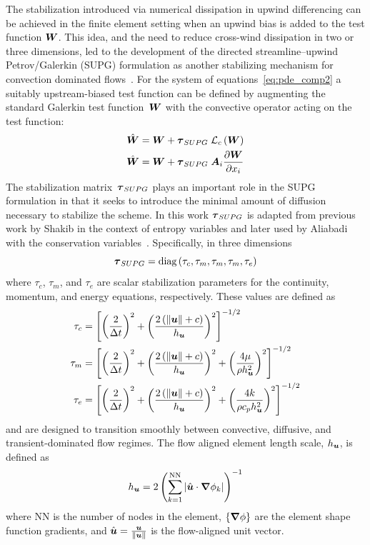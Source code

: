 The stabilization introduced via numerical dissipation in upwind differencing can be achieved in the finite element setting when an upwind bias is added to the test function ${\boldsymbol{W}}$.  This idea, and the need to reduce cross-wind dissipation in two or three dimensions, led to the development of the directed  streamline--upwind Petrov/Galerkin (SUPG) formulation as another stabilizing mechanism for convection dominated flows~\cite{ hughes_mallet_SUPG}.    For the system of equations~\eqref{eq:pde_comp2} a suitably upstream-biased test function can be defined by augmenting the standard Galerkin test function~${\boldsymbol{W}}$ with the convective operator acting on the test function:
\begin{align}
  \hat{{\boldsymbol{W}}} &= {\boldsymbol{W}} + {\boldsymbol{\tau}}_{SUPG}\;{\cal L}_c\left({\boldsymbol{W}}\right) \nonumber \\
  \label{eq:test_function_SUPG}
  \hat{{\boldsymbol{W}}} &= {\boldsymbol{W}} + {\boldsymbol{\tau}}_{SUPG}\;{\boldsymbol{A}}_i{\frac{\partial{{\boldsymbol{W}}}}{\partial{x_i}}}
\end{align}
The stabilization matrix~${\boldsymbol{\tau}}_{SUPG}$ plays an important role in the SUPG formulation in that it seeks to introduce the minimal amount of diffusion necessary to stabilize the scheme.  In this work ${\boldsymbol{\tau}}_{SUPG}$ is adapted from previous work by Shakib in the context of entropy variables and later used by Aliabadi with the conservation variables~\cite{skaliabadi_dissertation,aliabadi_tezduyar_IJNMF_1995}.  Specifically, in three dimensions
\begin{equation}
  {\boldsymbol{\tau}}_{SUPG} = \mbox{diag}\left(\tau_c,\tau_m,\tau_m,\tau_m,\tau_e\right)
\end{equation}
where $\tau_c$, $\tau_m$, and $\tau_e$ are scalar stabilization parameters for the continuity, momentum, and energy equations, respectively.  These values are defined as
\begin{align}
  \tau_c &= \left[\left(\frac{2}{\Delta t}\right)^2 + \left(\frac{2\left( \|{\boldsymbol{u}}\| + c\right)}{h_{{\boldsymbol{u}}}}\right)^2\right]^{-1/2} \nonumber \\
  \tau_m &= \left[\left(\frac{2}{\Delta t}\right)^2 + \left(\frac{2\left( \|{\boldsymbol{u}}\| + c\right)}{h_{{\boldsymbol{u}}}}\right)^2 + \left(\frac{4 \mu}{\rho h_{{\boldsymbol{u}}}^2}\right)^2\right]^{-1/2} \nonumber \\
  \tau_e &= \left[\left(\frac{2}{\Delta t}\right)^2 + \left(\frac{2\left( \|{\boldsymbol{u}}\| + c\right)}{h_{{\boldsymbol{u}}}}\right)^2 + \left(\frac{4 k}{\rho c_p h_{{\boldsymbol{u}}}^2}\right)^2\right]^{-1/2} \nonumber 
\end{align}
and are designed to transition smoothly between convective, diffusive, and transient-dominated flow regimes.  The flow aligned element length scale, $h_{{\boldsymbol{u}}}$, is defined as
\begin{equation*}
  h_{{\boldsymbol{u}}} = 2 \left(\sum_{k=1}^{\text{NN}}\left|\hat{{\boldsymbol{u}}}\cdot{\boldsymbol{\nabla}} {\phi}_k\right|\right)^{-1} 
\end{equation*}
where NN is the number of nodes in the element, $\{{\boldsymbol{\nabla}} {\phi}\}$ are the element shape function gradients, and $\hat{{\boldsymbol{u}}}=\frac{{\boldsymbol{u}}}{\|{\boldsymbol{u}}\|}$ is the flow-aligned unit vector.

